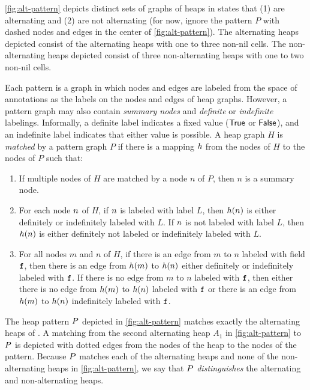 \begin{ex}
  \label{ex:concrete-heaps}
  \autoref{fig:alt-pattern} depicts distinct sets of graphs of heaps
  in \altlist states that (1) are alternating and (2) are not
  alternating (for now, ignore the pattern $P$ with dashed nodes and
  edges in the center of \autoref{fig:alt-pattern}).
  The alternating heaps depicted consist of the alternating heaps with
  one to three non-nil cells.
  The non-alternating heaps depicted consist of three non-alternating
  heaps with one to two non-nil cells.
\end{ex}

Each pattern is a graph in which nodes and edges are labeled from the
space of annotations as the labels on the nodes and edges of heap
graphs.
%
However, a pattern graph may also contain \emph{summary nodes} and
\emph{definite} or \emph{indefinite} labelings. Informally, a definite label indicates a fixed value ($\mathsf{True}$ or $\mathsf{False}$), and an indefinite label indicates that either value is possible.
%
A heap graph $H$ is \emph{matched} by a pattern graph $P$ if there is
a mapping $h$ from the nodes of $H$ to the nodes of $P$ such
that:
%
\begin{enumerate}
\item
  If multiple nodes of $H$ are matched by a node $n$ of $P$, then $n$
  is a summary node.
\item
  For each node $n$ of $H$, if $n$ is labeled with label $L$,
  then $h(n)$ is either definitely or indefinitely labeled
  with $L$.
  If $n$ is not labeled with label $L$, then $h(n)$
  is either definitely not labeled or indefinitely labeled with $L$.
\item
  For all nodes $m$ and $n$ of $H$, if there is an edge from $m$ to
  $n$ labeled with field $\mathtt{f}$, then there is an edge from
  $h(m)$ to $h(n)$ either definitely or indefinitely
  labeled with $\mathtt{f}$.
  If there is no edge from $m$ to $n$ labeled with $\mathtt{f}$, then
  either there is no edge from $h(m)$ to $h(n)$ labeled
  with $\mathtt{f}$ or there is an edge from $h(m)$ to
  $h(n)$ indefinitely labeled with $\mathtt{f}$.
\end{enumerate}

\begin{ex}
  \label{ex:heap-pats}
  The heap pattern $P$ depicted in \autoref{fig:alt-pattern}
  matches exactly the alternating heaps of \altlist.
  A matching from the second alternating heap $A_1$ in
  \autoref{fig:alt-pattern} to $P$ is depicted with dotted edges
  from the nodes of the heap to the nodes of the pattern.
  Because $P$ matches each of the alternating heaps and none of
  the non-alternating heaps in \autoref{fig:alt-pattern}, we say that
  $P$ \emph{distinguishes} the alternating and non-alternating
  heaps.
\end{ex}

